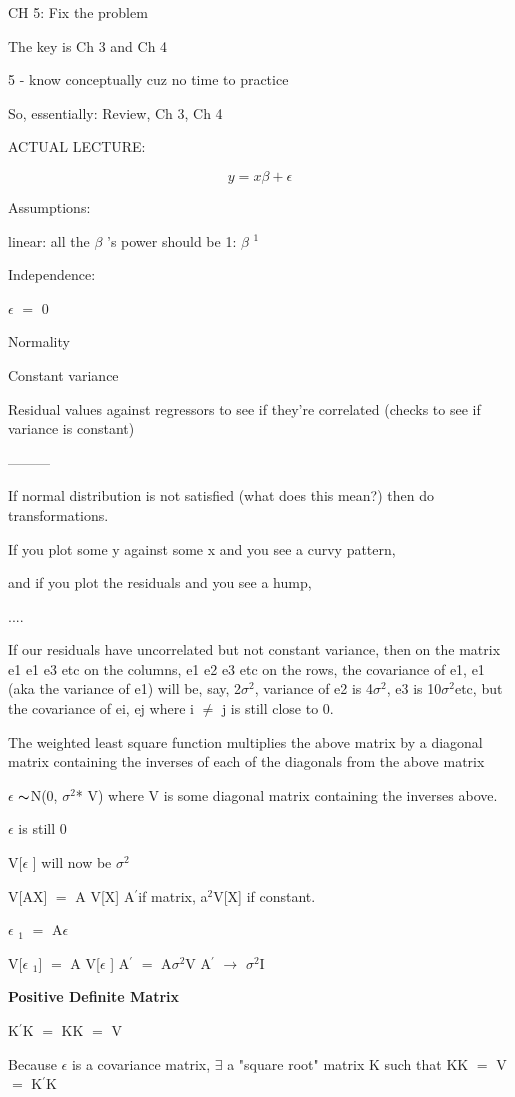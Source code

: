 \documentclass[12pt]{extarticle}
\newcommand{\mt}[1]{\ensuremath{#1}}
\newcommand{\ep}{\mt{\epsilon} }         %
\newcommand{\bta}{\mt{\beta} }
\newcommand{\exs}{\mt{\exists} }
\newcommand{\lra}{ \mt{\longrightarrow} } %
\newcommand{\eql}{ \mt{\operatorname{=}} }
\newcommand{\pr}{\mt{^\prime}} 		   %
\newcommand{\uw}[2]{#1\mt{_{#2}}}
\newcommand{\uf}[2]{#1\mt{^{#2}}}
\newcommand{\eqn}[1]{\[#1\]}
\newcommand{\txt}[1]{\text{#1}} %
\newcommand{\tl}{\mt{\thicksim}}
\newcommand{\ssq}{\mt{\sigma^2}}
\newcommand{\exv}[1]{\txt{E[}#1\txt{]}}
\newcommand{\vrn}[1]{V[#1]}
\begin{document}
CH 5: Fix the problem

The key is Ch 3 and Ch 4

5 - know conceptually cuz no time to practice 

So, essentially: Review, Ch 3, Ch 4

ACTUAL LECTURE:

\eqn{y = x\bta + \epsilon}

Assumptions:

linear: all the \bta's power should be 1: \uf{\bta}{1}

Independence: 

\exv{ \ep} \eql 0

Normality

Constant variance


Residual values against regressors to see if they're correlated (checks to see if variance is constant)

---------

If normal distribution is not satisfied (what does this mean?) then do transformations.

If you plot some y against some x and you see a curvy pattern,

and if you plot the residuals and you see a hump,

....

If our residuals have uncorrelated but not constant variance, then on the matrix e1 e1 e3 etc on the columns, e1 e2 e3 etc on the rows, the covariance of e1, e1 (aka the variance of e1) will be, say, 2\ssq, variance of e2 is 4\ssq, e3 is 10\ssq etc, but the covariance of ei, ej where i $\neq$ j is still close to 0.

The weighted least square function multiplies the above matrix by a diagonal matrix containing the inverses of each of the diagonals from the above matrix

\ep \tl N(0, \ssq * V) where V is some diagonal matrix containing the inverses above.

\exv{\ep} is still 0

\vrn{\ep} will now be \ssq 

\vrn{AX} \eql A \vrn{X} A\pr if matrix, \uf{a}{2}\vrn{X} if constant.

\uw{\ep}{1} \eql A\ep

\vrn{\uw{\ep}{1}} \eql A \vrn{\ep} A\pr \eql A\ssq V A\pr \lra \ssq I

\textbf{Positive Definite Matrix}

K\pr K \eql KK \eql V

Because \ep is a covariance matrix, \exs a "square root" matrix K such that KK \eql V \eql K\pr K
\end{document}
